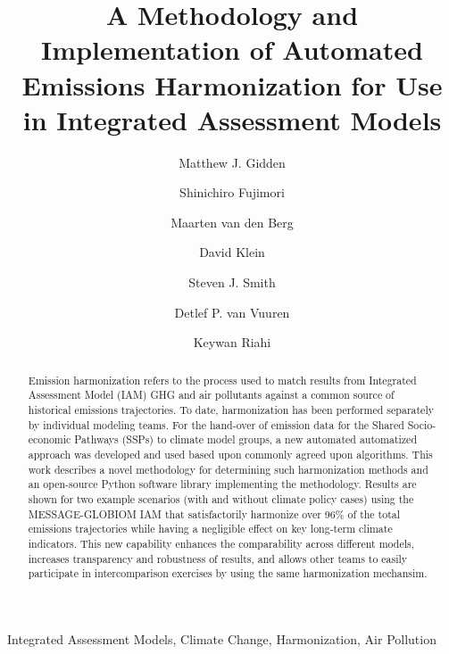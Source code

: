 \begin{frontmatter}

\title{A Methodology and Implementation of Automated Emissions Harmonization for Use in Integrated Assessment Models}

\author[iiasa]{Matthew J. Gidden}

\author[nies]{Shinichiro Fujimori}
\author[pbl]{Maarten van den Berg}
\author[pik]{David Klein}
\author[pnnl]{Steven J. Smith}
\author[pbl]{Detlef P. van Vuuren}
\author[iiasa]{Keywan Riahi}

\address[iiasa]{International Institute for Applied Systems Analysis,
  Schlossplatz 1, A-2361 Laxenburg, Austria}
\address[nies]{Center for Social and Environmental Systems Research, National Institute for Environmental Studies, 16-2 Onogawa, Tsukuba, Ibaraki 305-8506, Japan}
\address[pbl]{PBL Netherlands Environmental Assessment Agency, Postbus 30314, 2500 GH The Hague, Netherlands}
\address[pik]{Potsdam Institute for Climate Impact Research (PIK), Member of the Leibniz Association, P.O. Box 60 12 03, D-14412 Potsdam, Germany}
\address[pnnl]{Joint Global Change Research Institute, 5825 University Research Court, Suite 3500, College Park, MD 20740}

\begin{abstract}
Emission harmonization refers to the process used to match results from
Integrated Assessment Model (IAM) GHG and air pollutants against a common source
of historical emissions trajectories. To date, harmonization has been performed
separately by individual modeling teams. For the hand-over of emission data for
the Shared Socio-economic Pathways (SSPs) to climate model groups, a new
automated automatized approach was developed and used based upon commonly agreed
upon algorithms. This work describes a novel methodology for determining such
harmonization methods and an open-source Python software library implementing
the methodology. Results are shown for two example scenarios (with and without
climate policy cases) using the MESSAGE-GLOBIOM IAM that satisfactorily
harmonize over 96\% of the total emissions trajectories while having a
negligible effect on key long-term climate indicators. This new capability
enhances the comparability across different models, increases transparency and
robustness of results, and allows other teams to easily participate in
intercomparison exercises by using the same harmonization mechansim.
\end{abstract}

\begin{keyword}
Integrated Assessment Models, Climate Change, Harmonization, Air Pollution 
\end{keyword}

\end{frontmatter}

\linenumbers
